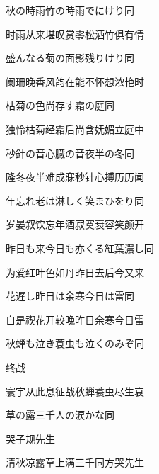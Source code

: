 \begin{haiku}
    {\FH 秋の時雨竹の時雨でにけり}\hfill{\FH 同}

    {\FK 时雨从来堪叹赏零松洒竹俱有情}
\end{haiku}

\begin{haiku}
    {\FH 盛んなる菊の面影残りけり}\hfill{\FH 同}

    {\FK 阑珊晚香风韵在能不怀想浓艳时}
\end{haiku}

\begin{haiku}
    {\FH 枯菊の色尚存す霜の庭}\hfill{\FH 同}

    {\FK 独怜枯菊经霜后尚含妩媚立庭中}
\end{haiku}

\begin{haiku}
    {\FH 秒針の音心臓の音夜半の冬}\hfill{\FH 同}

    {\FK 隆冬夜半难成寐秒针心搏历历闻}
\end{haiku}

\begin{haiku}
    {\FH 年忘れ老は淋しく笑まひをり}\hfill{\FH 同}

    {\FK 岁晏叙饮忘年酒寂寞衰容笑颜开}
\end{haiku}

\begin{haiku}
    {\FH 昨日も来今日も亦くる紅葉濃し}\hfill{\FH 同}

    {\FK 为爱红叶色如丹昨日去后今又来}
\end{haiku}

\begin{haiku}
    {\FH 花遅し昨日は余寒今日は雷}\hfill{\FH 同}

    {\FK 自是禊花开较晚昨日余寒今日雷}
\end{haiku}

\begin{haiku}
    {\FH 秋蝉も泣き蓑虫も泣くのみぞ}\hfill{\FH 同}

    {\FK 终战}

    {\FK 寰宇从此息征战秋蝉蓑虫尽生哀}
\end{haiku}

\begin{haiku}
    {\FH 草の露三千人の涙かな}\hfill{\FH 同}

    {\FK 哭子规先生}

    {\FK 清秋凉露草上满三千同方哭先生}
\end{haiku}

